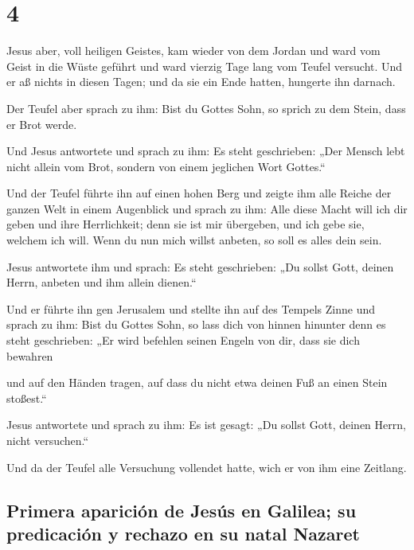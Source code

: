 \hypertarget{section-3}{%
\section{4}\label{section-3}}

 Jesus aber, voll heiligen Geistes, kam wieder von dem
Jordan und ward vom Geist in die Wüste geführt  und ward
vierzig Tage lang vom Teufel versucht. Und er aß nichts in diesen Tagen;
und da sie ein Ende hatten, hungerte ihn darnach.

 Der Teufel aber sprach zu ihm: Bist du Gottes Sohn, so
sprich zu dem Stein, dass er Brot werde.

 Und Jesus antwortete und sprach zu ihm: Es steht
geschrieben: „Der Mensch lebt nicht allein vom Brot, sondern von einem
jeglichen Wort Gottes.``

 Und der Teufel führte ihn auf einen hohen Berg und zeigte
ihm alle Reiche der ganzen Welt in einem Augenblick  und
sprach zu ihm: Alle diese Macht will ich dir geben und ihre
Herrlichkeit; denn sie ist mir übergeben, und ich gebe sie, welchem ich
will.  Wenn du nun mich willst anbeten, so soll es alles
dein sein.

 Jesus antwortete ihm und sprach: Es steht geschrieben:
„Du sollst Gott, deinen Herrn, anbeten und ihm allein dienen.``

 Und er führte ihn gen Jerusalem und stellte ihn auf des
Tempels Zinne und sprach zu ihm: Bist du Gottes Sohn, so lass dich von
hinnen hinunter  denn es steht geschrieben: „Er wird
befehlen seinen Engeln von dir, dass sie dich bewahren

 und auf den Händen tragen, auf dass du nicht etwa deinen
Fuß an einen Stein stoßest.``

 Jesus antwortete und sprach zu ihm: Es ist gesagt: „Du
sollst Gott, deinen Herrn, nicht versuchen.``

 Und da der Teufel alle Versuchung vollendet hatte, wich
er von ihm eine Zeitlang.

\hypertarget{primera-apariciuxf3n-de-jesuxfas-en-galilea-su-predicaciuxf3n-y-rechazo-en-su-natal-nazaret}{%
\subsection{Primera aparición de Jesús en Galilea; su predicación y
rechazo en su natal
Nazaret}\label{primera-apariciuxf3n-de-jesuxfas-en-galilea-su-predicaciuxf3n-y-rechazo-en-su-natal-nazaret}}

